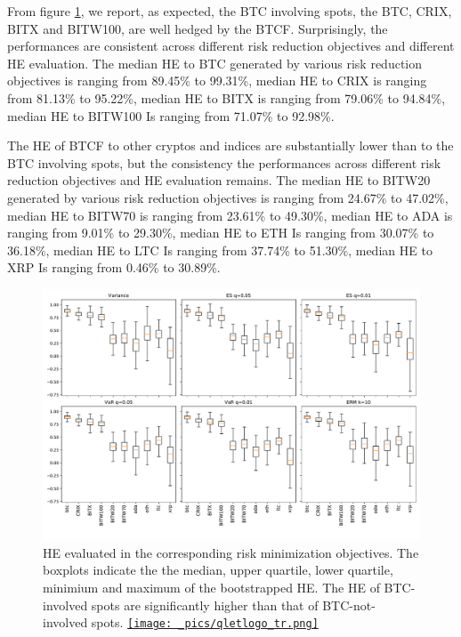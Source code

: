 From figure \ref{fig:HEboxplot}, we report, as expected, the BTC involving spots, the BTC, CRIX, BITX and BITW100, are well hedged by the BTCF.
Surprisingly, the performances are consistent across different risk reduction objectives and different HE evaluation.
The median HE to BTC generated by various risk reduction objectives is ranging from 89.45\% to 99.31\%, median HE to CRIX is ranging from 81.13\% to 95.22\%,
median HE to BITX is ranging from 79.06\% to 94.84\%, median HE to BITW100 Is ranging from 71.07\% to 92.98\%. \medskip

The HE of BTCF to other cryptos and indices are substantially lower than to the BTC involving spots, but the consistency the performances across different risk reduction objectives and HE evaluation remains.
The median HE to BITW20 generated by various risk reduction objectives is ranging from 24.67\% to 47.02\%, median HE to BITW70 is ranging from 23.61\% to 49.30\%,
median HE to ADA is ranging from 9.01\% to 29.30\%, median HE to ETH Is ranging from 30.07\% to 36.18\%, median HE to LTC Is ranging from 37.74\% to 51.30\%,
median HE to XRP Is ranging from 0.46\% to 30.89\%.
\begin{figure}[h]
\includegraphics[width=\textwidth]{_pics/ES5_HE_boxplot.pdf}
  \caption{HE evaluated in the corresponding risk minimization objectives.
            The boxplots indicate the the median, upper quartile, lower quartile, minimium and maximum of the bootstrapped HE.
            The HE of BTC-involved spots are significantly higher than that of BTC-not-involved spots.
  \href{http://www.quantlet.com/}{\texttt{[image: \_pics/qletlogo\_tr.png]}} }
\label{fig:HEboxplot}
\end{figure}


